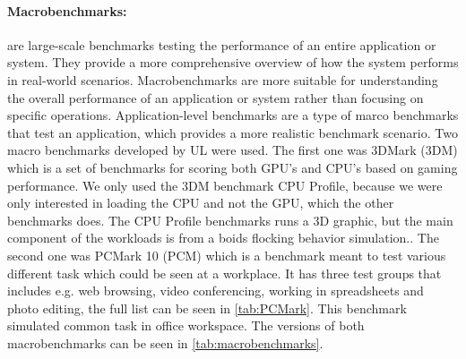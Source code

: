 \paragraph{Macrobenchmarks:} are large-scale benchmarks testing the performance of an entire application or system. They provide a more comprehensive overview of how the system performs in real-world scenarios. Macrobenchmarks are more suitable for understanding the overall performance of an application or system rather than focusing on specific operations.\cite{MicroVSMacro} Application-level benchmarks are a type of marco benchmarks that test an application, which provides a more realistic benchmark scenario. Two macro benchmarks developed by UL were used. The first one was 3DMark (3DM) which is a set of benchmarks for scoring both GPU's and CPU's based on gaming performance. We only used the 3DM benchmark CPU Profile, because we were only interested in loading the CPU and not the GPU, which the other benchmarks does. The CPU Profile benchmarks runs a 3D graphic, but the main component of the workloads is from a boids flocking behavior simulation.\cite{3dmark}. The second one was PCMark 10 (PCM) which is a benchmark meant to test various different task which could be seen at a workplace. It has three test groups that includes e.g. web browsing, video conferencing, working in spreadsheets and photo editing, the full list can be seen in \cref{tab:PCMark}. This benchmark simulated common task in office workspace.\cite{pcmark} The versions of both macrobenchmarks can be seen in \cref{tab:macrobenchmarks}.

